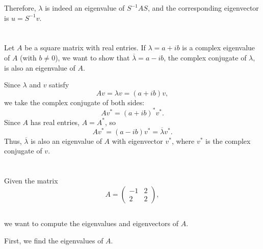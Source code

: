\documentclass{article}
\begin{document}
Therefore, \(\lambda\) is indeed an eigenvalue of \(S^{-1} A S\), and the corresponding eigenvector is \(u = S^{-1} v\).

\section{}
Let \( A \) be a square matrix with real entries. If \(\lambda = a + ib\) is a complex eigenvalue of \( A \) (with \( b \neq 0 \)), we want to show that \(\overline{\lambda} = a - ib\), the complex conjugate of \(\lambda\), is also an eigenvalue of \( A \).

Since \(\lambda\) and \(v\) satisfy
\[
    A v = \lambda v = (a + ib) v,
\]
we take the complex conjugate of both sides:
\[
    A v^* = (a + ib)^* v^*.
\]
Since \(A\) has real entries, \(A = A^*\), so
\[
    A v^* = (a - ib) v^* = \overline{\lambda} v^*.
\]
Thus, \(\overline{\lambda}\) is also an eigenvalue of \( A \) with eigenvector \(v^*\), where \(v^*\) is the complex conjugate of \(v\).

\section{}
Given the matrix
\[
    A = \begin{pmatrix} -1 & 2 \\ 2 & 2 \end{pmatrix},
\]
\subsection{}
we want to compute the eigenvalues and eigenvectors of \( A \).

First, we find the eigenvalues of \( A \).
\end{document}
